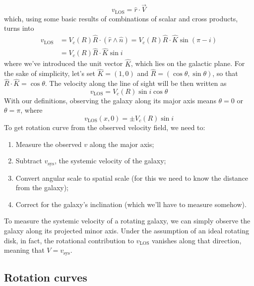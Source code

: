 \begin{equation*}
    v_{\text{LOS}} = \hat{r}\cdot \vec{V}
\end{equation*}
which, using some basic results of combinations of scalar and cross products, turns into
\begin{align*}
    v_{\text{LOS}} &= V_{c}(R)\hat{R}\cdot(\hat{r}\wedge\hat{n}) = V_{c}(R)\hat{R}\cdot\hat{K}\sin(\pi-i)\\
    & = V_{c}(R)\hat{R}\cdot\hat{K}\sin i
\end{align*}
where we've introduced the unit vector $\hat{K}$, which lies on the galactic plane. For the sake of simplicity, let's set $\hat{K} = (1,0)$ and $\hat{R} = (\cos\theta, \sin\theta)$, so that $\hat{R}\cdot\hat{K} = \cos\theta$. The velocity along the line of sight will be then written as 
\begin{equation*}
    v_{\text{LOS}} = V_{c}(R)\sin i \cos\theta
\end{equation*}
With our definitions, observing the galaxy along its major axis means $\theta = 0$ or $\theta = \pi$, where 
\begin{equation*}
    v_{\text{LOS}}(x,0) = \pm V_{c}(R)\sin i
\end{equation*}
To get rotation curve from the observed velocity field, we need to:
\begin{enumerate}
    \item Measure the observed $v$ along the major axis;
    \item Subtract $v_{\text{sys}}$, the systemic velocity of the galaxy;
    \item Convert angular scale to spatial scale (for this we need to know the distance from the galaxy);
    \item Correct for the galaxy's inclination (which we'll have to measure somehow). 
\end{enumerate}
To measure the systemic velocity of a rotating galaxy, we can simply observe the galaxy along its projected minor axis. Under the assumption of an ideal rotating disk, in fact, the rotational contribution to $v_{\text{LOS}}$ vanishes along that direction, meaning that $V = v_{\text{sys}}$.

\subsection{Rotation curves}

